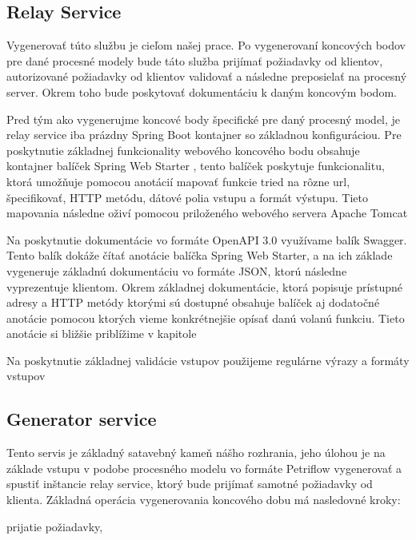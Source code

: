 \subsection{Relay Service} 

Vygenerovať túto službu je cieľom našej prace. Po vygenerovaní koncových bodov pre dané procesné modely bude táto služba prijímať požiadavky od klientov, autorizované požiadavky od klientov validovať a následne preposielať na procesný server. Okrem toho bude poskytovať dokumentáciu k daným koncovým bodom. 

Pred tým ako vygenerujme koncové body špecifické pre daný procesný model, je relay service iba prázdny Spring Boot kontajner so základnou konfiguráciou. Pre poskytnutie základnej funkcionality webového koncového bodu obsahuje kontajner balíček Spring Web Starter \cite{webstarter}, tento balíček poskytuje funkcionalitu, ktorá umožňuje pomocou anotácií mapovať funkcie tried na rôzne \acrshort{url}, špecifikovať, HTTP metódu, dátové polia vstupu a formát výstupu. Tieto mapovania následne oživí pomocou priloženého webového servera Apache Tomcat \cite{tomcat} 


Na poskytnutie dokumentácie vo formáte OpenAPI 3.0 \cite{openapi3} využívame balík Swagger. Tento balík dokáže čítať anotácie balíčka Spring Web Starter, a na ich základe vygeneruje základnú dokumentáciu vo formáte JSON, ktorú následne vyprezentuje klientom. Okrem základnej dokumentácie, ktorá popisuje prístupné adresy a HTTP metódy ktorými sú dostupné obsahuje balíček aj dodatočné anotácie pomocou ktorých vieme konkrétnejšie opísať danú volanú funkciu. Tieto anotácie si bližšie priblížime v kapitole  



Na poskytnutie základnej validácie vstupov použijeme regulárne výrazy a formáty vstupov 





\subsection{Generator service}  
Tento servis je základný satavebný kameň nášho rozhrania, jeho úlohou je na základe vstupu v podobe procesného modelu vo formáte Petriflow vygenerovať a spustiť inštancie relay service, ktorý bude prijímať samotné požiadavky od klienta. Základná operácia vygenerovania koncového dobu má nasledovné kroky:  

prijatie požiadavky,  

